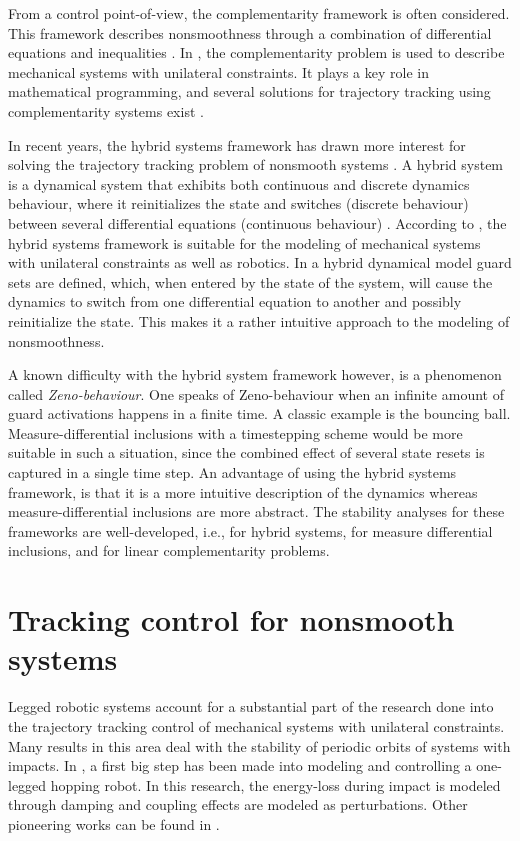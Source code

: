 \documentclass[../DC2019003Bouma.tex]{subfiles}
\begin{document}
From a control point-of-view, the complementarity framework is often considered. This framework describes nonsmoothness through a combination of differential equations and inequalities \cite{VanDerSchaft1998,Heemels1999}. In \cite{Glocker2001}, the complementarity problem is used to describe mechanical systems with unilateral constraints. It plays a key role in mathematical programming, and several solutions for trajectory tracking using complementarity systems exist \cite{Bourgeot2005,Morarescu2010}. 

In recent years, the hybrid systems framework has drawn more interest for solving the trajectory tracking problem of nonsmooth systems \cite{Hyun2014,Morris2009}. A hybrid system is a dynamical system that exhibits both continuous and discrete dynamics behaviour, where it reinitializes the state and switches (discrete behaviour) between several differential equations (continuous behaviour) \cite{Goebel2009}. According to \cite{Ding2011a}, the hybrid systems framework is suitable for the modeling of mechanical systems with unilateral constraints as well as robotics. In a hybrid dynamical model guard sets are defined, which, when entered by the state of the system, will cause the dynamics to switch from one differential equation to another and possibly reinitialize the state. This makes it a rather intuitive approach to the modeling of nonsmoothness. 

A known difficulty with the hybrid system framework however, is a phenomenon called \textit{Zeno-behaviour}. One speaks of Zeno-behaviour when an infinite amount of guard activations happens in a finite time. A classic example is the bouncing ball. Measure-differential inclusions with a timestepping scheme would be more suitable in such a situation, since the combined effect of several state resets is captured in a single time step. An advantage of using the hybrid systems framework, is that it is a more intuitive description of the dynamics whereas measure-differential inclusions are more abstract. The stability analyses for these frameworks are well-developed, i.e., \cite{Ye1998,Lygeros2003,Goebel2009} for hybrid systems, \cite{Pereira2004,Brogliato2004,Leine2008} for measure differential inclusions, and \cite{Brogliato1999,Camlibel2006,Camlibel2007} for linear complementarity problems.

\section{Tracking control for nonsmooth systems}
Legged robotic systems account for a substantial part of the research done into the trajectory tracking control of mechanical systems with unilateral constraints. Many results in this area deal with the stability of periodic orbits of systems with impacts. In \cite{Raibert1984}, a first big step has been made into modeling and controlling a one-legged hopping robot. In this research, the energy-loss during impact is modeled through damping and coupling effects are modeled as perturbations. Other pioneering works can be found in \cite{Lebaudy1993,Michalska1996,Gregorio1997}. 
\end{document}
